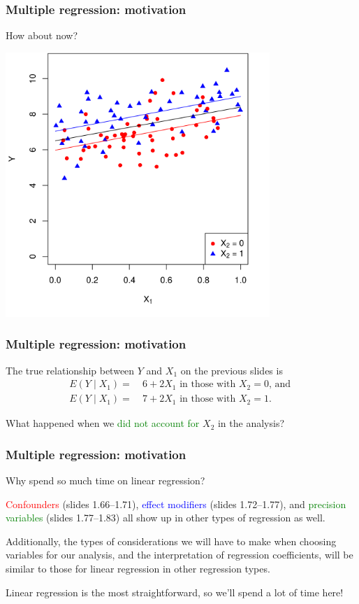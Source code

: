 \documentclass[12pt, 
hyperref={colorlinks=true, linkcolor=blue, urlcolor=cyan},dvipsnames]{beamer}
\begin{document}
\begin{frame}
\frametitle{Multiple regression: motivation}
How about now?

\centering
\includegraphics[width=0.75\textwidth]{plots/precision_colored_with_multiple_lines.png}
\end{frame}

\begin{frame}
\frametitle{Multiple regression: motivation}
The true relationship between $Y$ and $X_1$ on the previous slides is 
\begin{align*}
E(Y \mid X_1) =& \ 6 + 2 X_1 \text{ in those with $X_2 = 0$, and } \\
E(Y \mid X_1) =& \ 7 + 2 X_1 \text{ in those with $X_2 = 1$}.
\end{align*}

What happened when we \textcolor{green}{did not account for} $X_2$ in the analysis? 
\end{frame}

\begin{frame}
\frametitle{Multiple regression: motivation}
Why spend so much time on linear regression?

\textcolor{red}{Confounders} (slides 1.66--1.71), \textcolor{blue}{effect modifiers} (slides 1.72--1.77), and \textcolor{green}{precision variables} (slides 1.77--1.83) all show up in other types of regression as well.

Additionally, the types of considerations we will have to make when choosing variables for our analysis, and the interpretation of regression coefficients, will be similar to those for linear regression in other regression types.

Linear regression is the most straightforward, so we'll spend a lot of time here!
\end{frame}
\end{document}
